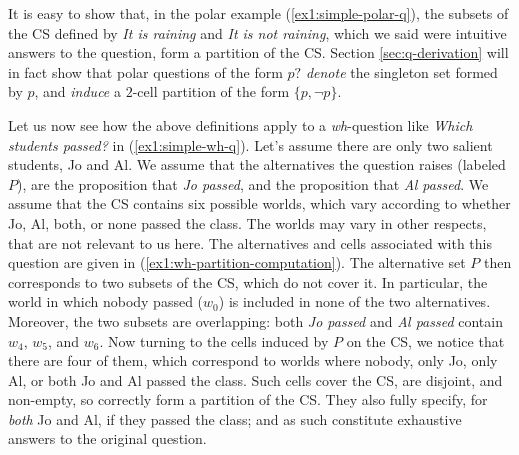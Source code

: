 It is easy to show that, in the polar example (\ref{ex1:simple-polar-q}), the subsets of the CS defined by \textit{It is raining} and \textit{It is not raining}, which we said were intuitive answers to the question, form a partition of the CS. Section \ref{sec:q-derivation} will in fact show that polar questions of the form $p?$ \textit{denote} the singleton set formed by $p$, and \textit{induce} a $2$-cell partition of the form $\lbrace p, \neg p\rbrace$.


Let us now see how the above definitions apply to a \textit{wh}-question like \textit{Which students passed?} in (\ref{ex1:simple-wh-q}). Let's assume there are only two salient students, Jo and Al. We assume that the alternatives the question raises (labeled $P$), are the proposition that \textit{Jo passed}, and the proposition that \textit{Al passed}. We assume that the CS contains six possible worlds, which vary according to whether Jo, Al, both, or none passed the class. The worlds may vary in other respects, that are not relevant to us here. The alternatives and cells associated with this question are given in (\ref{ex1:wh-partition-computation}). The alternative set $P$ then corresponds to two subsets of the CS, which do not cover it. In particular, the world in which nobody passed ($w_0$) is included in none of the two alternatives. Moreover, the two subsets are overlapping: both \textit{Jo passed} and \textit{Al passed} contain $w_4$, $w_5$, and $w_6$. Now turning to the cells induced by $P$ on the CS, we notice that there are four of them, which correspond to worlds where nobody, only Jo, only Al, or both Jo and Al passed the class. Such cells cover the CS, are disjoint, and non-empty, so correctly form a partition of the CS. They also fully specify, for \textit{both} Jo and Al, if they passed the class; and as such constitute exhaustive answers to the original question.

